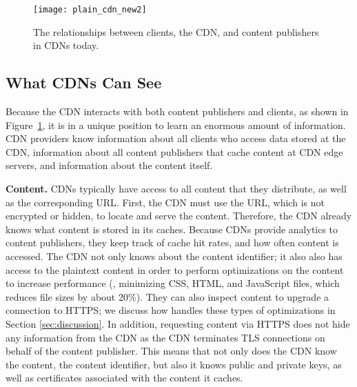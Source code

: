 \begin{figure}[t]
\centering
\texttt{[image: plain\_cdn\_new2]}
\caption{The relationships between clients, the CDN, and content publishers in 
CDNs today.}
\label{fig:basic_cdn}
\end{figure}

\subsection{What CDNs Can See}
\label{sec:info}

Because the CDN interacts with both content publishers and clients, as shown
in Figure~\ref{fig:basic_cdn}, it is in a unique position to learn an
enormous amount of information.  CDN providers know information about all
clients who access data stored at the CDN, information about all content
publishers that cache content at  CDN edge servers, and information about the
content itself.

\textbf{Content.}  CDNs typically have access to all content that they distribute,
as well as 
the corresponding URL.  First, the CDN must use the URL, which is not 
encrypted or hidden, to locate and serve the content. Therefore, 
the CDN already knows what content is
stored in its caches.  Because CDNs provide analytics to content publishers, they
keep track of cache hit 
rates, and how often content is accessed.  The CDN not only knows
about the content identifier; it also also 
has access to the plaintext content in order to perform optimizations on the content
to increase performance (\eg, minimizing CSS, HTML, and JavaScript files, which reduces file sizes by about 20\%).  
They can also inspect content to upgrade a connection to HTTPS; we discuss how 
\system{} handles these types of optimizations
in Section \ref{sec:discussion}. In addition, requesting content via HTTPS does not hide any information 
from the CDN as the CDN terminates TLS connections on behalf of the 
content publisher.  This means that not only does the CDN know the content, the
content identifier, but also it knows 
public and private keys, as well as certificates associated with the content it caches.  



